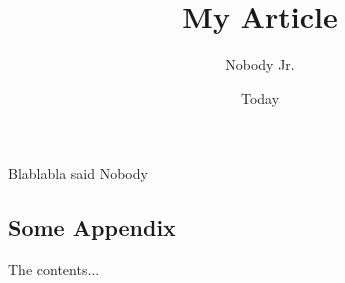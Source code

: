 \documentclass[11pt]{article}
\begin{document}
\nocite{*}

\title{My Article}
\author{Nobody Jr.}
\date{Today}
\maketitle

Blablabla said Nobody
\clearpage


\begin{appendices}
\section{Some Appendix} %
The contents...
\end{appendices}
\clearpage

\printbibliography{}
\clearpage
\end{document}

